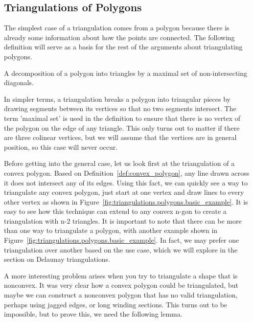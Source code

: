 \subsection{Triangulations of Polygons}


The simplest case of a triangulation comes from a polygon because there is already some information about how the points are connected.
The following definition will serve as a basis for the rest of the arguments about triangulating polygons.

\begin{definition}
	A decomposition of a polygon into triangles by a maximal set of non-intersecting diagonals.
	\label{def:triangulations.polygons.primary}
\end{definition}

In simpler terms, a triangulation breaks a polygon into triangular pieces by drawing segments between its vertices so that no two segments intersect.
The term 'maximal set' is used in the definition to ensure that there is no vertex of the polygon on the edge of any triangle.
This only turns out to matter if there are three colinear vertices, but we will assume that the vertices are in general position, so this case will never occur.

Before getting into the general case, let us look first at the triangulation of a convex polygon.
Based on Definition~\ref{def:convex_polygon}, any line drawn across it does not intersect any of its edges.
Using this fact, we can quickly see a way to triangulate any convex polygon, just start at one vertex and draw lines to every other vertex as shown in Figure~\ref{fig:triangulations.polygons.basic_example}.
It is easy to see how this technique can extend to any convex n-gon to create a triangulation with n-2 triangles.
It is important to note that there can be more than one way to triangulate a polygon, with another example shown in Figure~\ref{fig:triangulations.polygons.basic_example}.
In fact, we may prefer one triangulation over another based on the use case, which we will explore in the section on Delaunay triangulations.

A more interesting problem arises when you try to triangulate a shape that is nonconvex.
It was very clear how a convex polygon could be triangulated, but maybe we can construct a nonconvex polygon that has no valid triangulation, perhaps using jagged edges, or long winding sections.
This turns out to be impossible, but to prove this, we need the following lemma.

